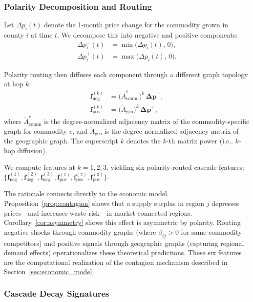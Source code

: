 \documentclass[preprint,12pt,authoryear]{elsarticle}
\begin{document}
\subsubsection{Polarity Decomposition and Routing}

Let $\Delta p_i(t)$ denote the 1-month price change for the commodity grown in county $i$ at time $t$. We decompose this into negative and positive components:
\begin{align}
    \Delta p_i^{-}(t) &= \min\bigl(\Delta p_i(t),\, 0\bigr), \label{eq:neg_shock} \\
    \Delta p_i^{+}(t) &= \max\bigl(\Delta p_i(t),\, 0\bigr). \label{eq:pos_shock}
\end{align}

Polarity routing then diffuses each component through a different graph topology at hop $k$:
\begin{align}
    \mathbf{f}_{\text{neg}}^{(k)} &= \bigl(\tilde{A}_{\text{comm}}^{c}\bigr)^k \,\bm{\Delta p}^{-}, \label{eq:neg_diffuse} \\
    \mathbf{f}_{\text{pos}}^{(k)} &= \bigl(\tilde{A}_{\text{geo}}\bigr)^k \,\bm{\Delta p}^{+}, \label{eq:pos_diffuse}
\end{align}
where $\tilde{A}_{\text{comm}}^{c}$ is the degree-normalized adjacency matrix of the commodity-specific graph for commodity $c$, and $\tilde{A}_{\text{geo}}$ is the degree-normalized adjacency matrix of the geographic graph. The superscript $k$ denotes the $k$-th matrix power (i.e., $k$-hop diffusion).

We compute features at $k = 1, 2, 3$, yielding six polarity-routed cascade features: $\{\mathbf{f}_{\text{neg}}^{(1)}, \mathbf{f}_{\text{neg}}^{(2)}, \mathbf{f}_{\text{neg}}^{(3)}, \mathbf{f}_{\text{pos}}^{(1)}, \mathbf{f}_{\text{pos}}^{(2)}, \mathbf{f}_{\text{pos}}^{(3)}\}$.

The rationale connects directly to the economic model. Proposition~\ref{prop:contagion} shows that a supply surplus in region $j$ depresses prices---and increases waste risk---in market-connected regions. Corollary~\ref{cor:asymmetry} shows this effect is asymmetric by polarity. Routing negative shocks through commodity graphs (where $\beta_{ij} > 0$ for same-commodity competitors) and positive signals through geographic graphs (capturing regional demand effects) operationalizes these theoretical predictions. These six features are the computational realization of the contagion mechanism described in Section~\ref{sec:economic_model}.

\subsubsection{Cascade Decay Signatures}
\end{document}
